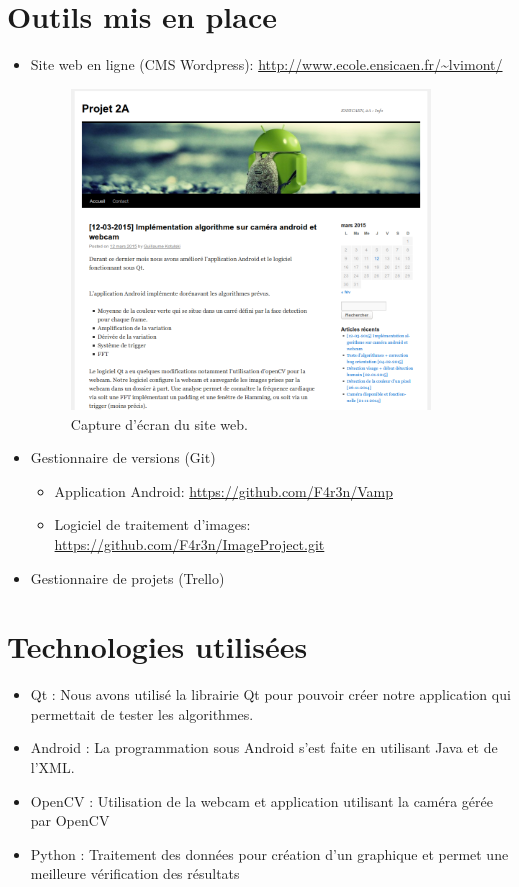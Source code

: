 \section{Outils mis en place}

\begin{itemize}
	\item Site web en ligne (CMS Wordpress): \url{http://www.ecole.ensicaen.fr/~lvimont/}

		\begin{figure}[h!]
			\centering
			\includegraphics[width=0.9\textwidth]{data/website.png}
			\caption{Capture d'écran du site web.}
		\end{figure}

	\item Gestionnaire de versions (Git)
		\begin{itemize}[label=\textbullet]
			\item Application Android: \url{https://github.com/F4r3n/Vamp}
			\item Logiciel de traitement d'images: \url{https://github.com/F4r3n/ImageProject.git}
		\end{itemize}
	\item Gestionnaire de projets (Trello)
\end{itemize}

\section{Technologies utilisées}

\begin{itemize}[label=\textbullet]
	\item Qt : Nous avons utilisé la librairie Qt pour pouvoir créer notre application qui permettait de tester les algorithmes.
	\item Android : La programmation sous Android s'est faite en utilisant Java et de l'XML.
	\item OpenCV : Utilisation de la webcam et application utilisant la caméra gérée  par OpenCV
	\item Python : Traitement des données pour création d'un graphique et permet une meilleure vérification des résultats
\end{itemize}

